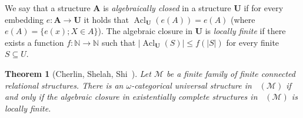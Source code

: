 \documentclass{elsarticle}
\def\Forbm{\mathop{\mathrm{Forb_m}}\nolimits}
\def\ACl{\mathop{\mathrm{Acl}}\nolimits}
\def\str#1{\mathbf {#1}}
\theoremstyle{plain}
\newtheorem{theorem}{Theorem}[section]
\theoremstyle{definition}
\theoremstyle{remark}
\begin{document}
We say that a structure $\str{A}$ is \emph{algebraically closed} in a structure $\str{U}$
if for every embedding $e\colon\str{A}\to \str{U}$ it holds that $\ACl_\str{U}(e(A))=e(A)$ (where $e(A)=\{e(x);X\in A\}$).
The algebraic closure in $\str{U}$ is \emph{locally finite} if there exists a
function $f\colon\mathbb N\to \mathbb N$ such that $\vert \ACl_\str{U}(S)\vert \leq
f(\vert S\vert )$ for every finite $S\subseteq U$.

\begin{theorem}[Cherlin, Shelah, Shi~\cite{Cherlin1999}]
\label{thm:CSS}
Let $\mathcal M$ be a finite family of finite connected relational structures.  There
is an $\omega$-categorical universal structure   in $\Forbm(\mathcal M)$
if and only if the algebraic closure  in existentially complete structures in
 $\Forbm(\mathcal M)$ is locally finite. 
\end{theorem}
\end{document}
